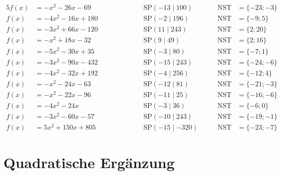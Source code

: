 \documentclass
[
  draft    = true,
  fontsize = 11pt,
  parskip  = half-,
  BCOR     = 0pt,
  DIV      = 11
]
{scrartcl}
\begin{document}
\begin{alignat*}{5}
  f(x)&=-x^{2}-26x-69 \qquad&\qquad \quad&\text{SP}(-13\mid100) \quad&\quad \text{NST}&=\{-23;-3\} \\[0.5ex]
  f(x)&=-4x^{2}-16x+180 \qquad&\qquad \quad&\text{SP}(-2\mid196) \quad&\quad \text{NST}&=\{-9;5\} \\[0.5ex]
  f(x)&=-3x^{2}+66x-120 \qquad&\qquad \quad&\text{SP}(11\mid243) \quad&\quad \text{NST}&=\{2;20\} \\[0.5ex]
  f(x)&=-x^{2}+18x-32 \qquad&\qquad \quad&\text{SP}(9\mid49) \quad&\quad \text{NST}&=\{2;16\} \\[0.5ex]
  f(x)&=-5x^{2}-30x+35 \qquad&\qquad \quad&\text{SP}(-3\mid80) \quad&\quad \text{NST}&=\{-7;1\} \\[0.5ex]
  f(x)&=-3x^{2}-90x-432 \qquad&\qquad \quad&\text{SP}(-15\mid243) \quad&\quad \text{NST}&=\{-24;-6\} \\[0.5ex]
  f(x)&=-4x^{2}-32x+192 \qquad&\qquad \quad&\text{SP}(-4\mid256) \quad&\quad \text{NST}&=\{-12;4\} \\[0.5ex]
  f(x)&=-x^{2}-24x-63 \qquad&\qquad \quad&\text{SP}(-12\mid81) \quad&\quad \text{NST}&=\{-21;-3\} \\[0.5ex]
  f(x)&=-x^{2}-22x-96 \qquad&\qquad \quad&\text{SP}(-11\mid25) \quad&\quad \text{NST}&=\{-16;-6\} \\[0.5ex]
  f(x)&=-4x^{2}-24x \qquad&\qquad \quad&\text{SP}(-3\mid36) \quad&\quad \text{NST}&=\{-6;0\} \\[0.5ex]
  f(x)&=-3x^{2}-60x-57 \qquad&\qquad \quad&\text{SP}(-10\mid243) \quad&\quad \text{NST}&=\{-19;-1\} \\[0.5ex]
  f(x)&=5x^{2}+150x+805 \qquad&\qquad \quad&\text{SP}(-15\mid-320) \quad&\quad \text{NST}&=\{-23;-7\}
\end{alignat*}

\clearpage
\section*{Quadratische Ergänzung}
\end{document}
